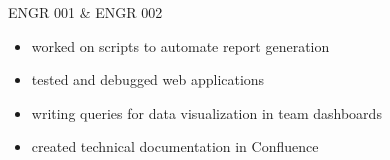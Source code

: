 \documentclass[11pt,a4paper,sans]{moderncv} %
\begin{document}
{ENGR 001 \& ENGR 002
\begin{itemize}
 \item worked on scripts to automate report generation 
 \item tested and debugged web applications
 \item writing queries for data visualization in team dashboards
 \item created technical documentation in Confluence
\end{itemize}}
%


\end{document}
